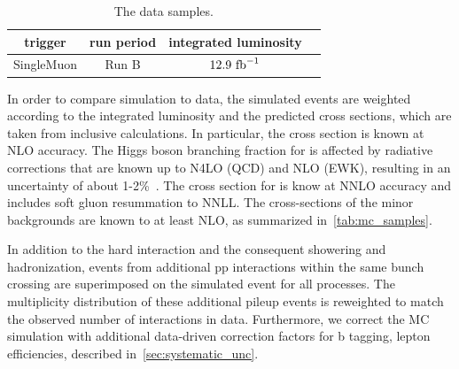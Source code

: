 \begin{table}[h!]
\begin{center}
\caption{The data samples.}
\label{tab:data_samples}
\begin{tabular}{cccc}
\hline
trigger & run period & integrated luminosity \\
\hline
SingleMuon & Run B & $12.9~\mathrm{fb}^{-1}$ \\
\hline
\hline
\end{tabular}
\end{center}
\end{table}

In order to compare simulation to data, the simulated events are weighted according to the integrated luminosity and the predicted cross sections, which are taken from inclusive calculations. In particular, the \ttH cross section is known at NLO accuracy\cite{Dittmaier:1318996,Beenakker:2001rj,Beenakker:2002nc,Dawson:2002tg,Dawson:2003zu}. The Higgs boson branching fraction for \Hbb is affected by radiative corrections that are known up to N4LO (QCD) and NLO (EWK), resulting in an uncertainty of about 1-2\%~\cite{Djouadi:1997yw,Butterworth:2010ym,deFlorian:2016spz}.
The cross section for \ttbar is know at NNLO accuracy and includes soft gluon resummation to NNLL\cite{Czakon:2011xx}. The cross-sections of the minor backgrounds are known to at least NLO, as summarized in~\cref{tab:mc_samples}.

In addition to the hard interaction and the consequent showering and hadronization, events from additional pp interactions within the same bunch crossing are superimposed on the simulated event for all processes. The multiplicity distribution of these additional pileup events is reweighted to match the observed number of interactions in data. Furthermore, we correct the MC simulation with additional data-driven correction factors for b tagging, lepton efficiencies, described in~\cref{sec:systematic_unc}.

